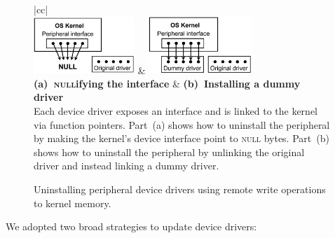 \documentclass[pageno]{sig-alternate-05-2015}
\newcommand{\mycaption}[2]{\caption{#1}#2}
\begin{document}
\begin{figure}[t!]
\begin{center}
\footnotesize
\begin{tabular}{|cc|}
\hline
{}\\
\includegraphics[keepaspectratio=true,height=0.85in]{driver-null.png} & 
\includegraphics[keepaspectratio=true,height=0.85in]{driver-dummy.png}\\
\textbf{(a)~\textsc{null}ifying the interface} &
\textbf{(b)~Installing a dummy driver}\\
{\small Each device driver exposes an interface and is linked to the kernel via
function pointers.  Part~(a) shows how to uninstall the peripheral by making
the kernel's device interface point to \textsc{null} bytes.  Part~(b) shows how
to uninstall the peripheral by unlinking the original driver and instead
linking a dummy driver.}\\
\hline
\end{tabular}
\end{center}
\indent\vspace{-0.7cm}
\mycaption{Uninstalling peripheral device drivers using remote write operations 
to kernel memory.}
{\label{figure:uninstall}}
\indent\vspace{-0.25cm}
\end{figure}

We adopted two broad strategies to update device drivers:  
\end{document}
